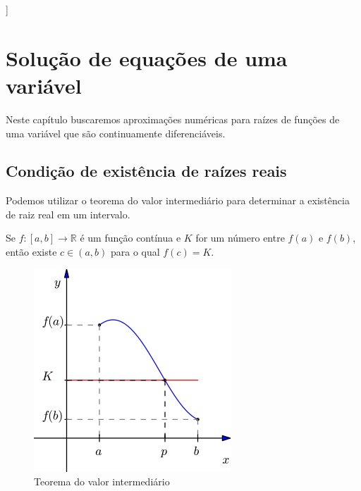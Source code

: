 ]%

%

\chapter{Solução de equações de uma variável}

Neste capítulo buscaremos aproximações numéricas para raízes de funções de uma variável que são continuamente diferenciáveis.

\section{Condição de existência de raízes reais}

Podemos utilizar o teorema do valor intermediário para determinar a existência de raiz real em um intervalo.

\begin{teo}
Se $f:[a,b]\to\mathbb{R}$ é um função contínua e $K$ for um número entre $f(a)$ e $f(b)$, então existe $c\in(a,b)$ para o qual $f(c)=K$.
\end{teo}

\begin{figure}[h!]
  \centering
  \includegraphics[scale=0.5]{./cap_equacao1d/pics/teorema_do_valor_intermediario/teorema_do_valor_intermediario.png}
  \caption{Teorema do valor intermediário}
  \label{fig:teorema_do_valor_intermediario}
\end{figure}

